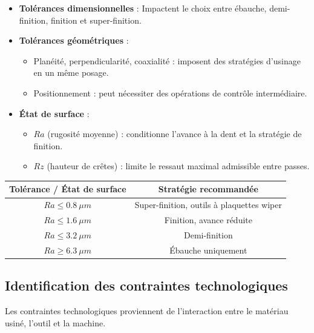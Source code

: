 \documentclass{article}
\begin{document}
\begin{itemize}
    \item \textbf{Tolérances dimensionnelles} : Impactent le choix entre ébauche, demi-finition, finition et super-finition.
    \item \textbf{Tolérances géométriques} : 
    \begin{itemize}
        \item Planéité, perpendicularité, coaxialité : imposent des stratégies d'usinage en un même posage.
        \item Positionnement : peut nécessiter des opérations de contrôle intermédiaire.
    \end{itemize}
    \item \textbf{État de surface} : 
    \begin{itemize}
        \item $Ra$ (rugosité moyenne) : conditionne l'avance à la dent et la stratégie de finition.
        \item $Rz$ (hauteur de crêtes) : limite le ressaut maximal admissible entre passes.
    \end{itemize}
\end{itemize}

\begin{tcolorbox}[colback=yellow!10!white, colframe=yellow!50!black, title=Exemple : Tolérances et stratégies d'usinage]
\begin{center}
\begin{tabular}{|c|c|}
\hline
\textbf{Tolérance / État de surface} & \textbf{Stratégie recommandée} \\
\hline
$Ra \leq 0.8 \ \mu m$ & Super-finition, outils à plaquettes wiper \\
\hline
$Ra \leq 1.6 \ \mu m$ & Finition, avance réduite \\
\hline
$Ra \leq 3.2 \ \mu m$ & Demi-finition \\
\hline
$Ra \geq 6.3 \ \mu m$ & Ébauche uniquement \\
\hline
\end{tabular}
\end{center}
\end{tcolorbox}

\subsection{Identification des contraintes technologiques}

Les contraintes technologiques proviennent de l'interaction entre le matériau usiné, l'outil et la machine.
\end{document}

